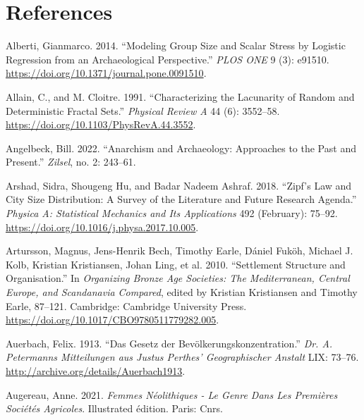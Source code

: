 \documentclass[
  12pt,
  a4paper, twoside]{book}
\newlength{\cslhangindent}
\newlength{\cslentryspacingunit} %
\newenvironment{CSLReferences}[2] %
 {%
  \setlength{\parindent}{0pt}
  \ifodd #1
  \let\oldpar\par
  \def\par{\hangindent=\cslhangindent\oldpar}
  \fi
  \setlength{\parskip}{#2\cslentryspacingunit}
 }%
 {}
\begin{document}
\hypertarget{refs}{}
\begin{CSLReferences}{1}{0}
\hypertarget{references}{%
\chapter*{References}\label{references}}

\leavevmode{}%
Alberti, Gianmarco. 2014. {``Modeling Group Size and Scalar Stress by Logistic Regression from an Archaeological Perspective.''} \emph{PLOS ONE} 9 (3): e91510. \url{https://doi.org/10.1371/journal.pone.0091510}.

\leavevmode{}%
Allain, C., and M. Cloitre. 1991. {``Characterizing the Lacunarity of Random and Deterministic Fractal Sets.''} \emph{Physical Review A} 44 (6): 3552--58. \url{https://doi.org/10.1103/PhysRevA.44.3552}.

\leavevmode{}%
Angelbeck, Bill. 2022. {``Anarchism and Archaeology: Approaches to the Past and Present.''} \emph{Zilsel}, no. 2: 243--61.

\leavevmode{}%
Arshad, Sidra, Shougeng Hu, and Badar Nadeem Ashraf. 2018. {``Zipf{'}s Law and City Size Distribution: A Survey of the Literature and Future Research Agenda.''} \emph{Physica A: Statistical Mechanics and Its Applications} 492 (February): 75--92. \url{https://doi.org/10.1016/j.physa.2017.10.005}.

\leavevmode{}%
Artursson, Magnus, Jens-Henrik Bech, Timothy Earle, Dániel Fuköh, Michael J. Kolb, Kristian Kristiansen, Johan Ling, et al. 2010. {``Settlement {Structure} and {Organisation}.''} In \emph{Organizing {Bronze Age Societies}: {The Mediterranean}, {Central Europe}, and {Scandanavia Compared}}, edited by Kristian Kristiansen and Timothy Earle, 87--121. {Cambridge}: {Cambridge University Press}. \url{https://doi.org/10.1017/CBO9780511779282.005}.

\leavevmode{}%
Auerbach, Felix. 1913. {``Das Gesetz der Bevölkerungskonzentration.''} \emph{Dr. A. Petermanns Mitteilungen aus Justus Perthes' Geographischer Anstalt} LIX: 73--76. \url{http://archive.org/details/Auerbach1913}.

\leavevmode{}%
Augereau, Anne. 2021. \emph{Femmes Néolithiques - Le Genre Dans Les Premières Sociétés Agricoles}. Illustrated édition. Paris: Cnrs.


\end{CSLReferences}
\end{document}
